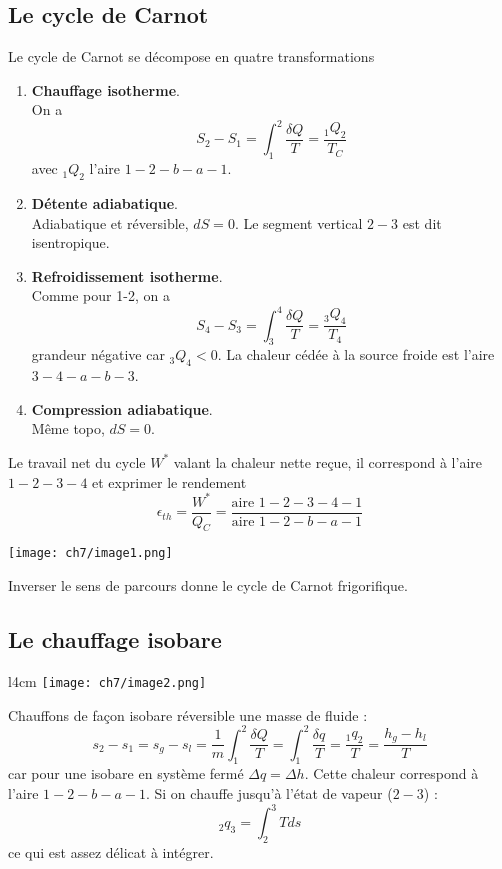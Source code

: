 		\subsection{Le cycle de Carnot}
		Le cycle de Carnot se décompose en quatre transformations
		\begin{enumerate}
		\item \textbf{Chauffage isotherme}.\\
		On a 
		\begin{equation}
		S_2-S_1 = \int_1^2 \dfrac{\delta Q}{T} = \dfrac{_1Q_2}{T_C}
		\end{equation}
		avec $_1Q_2$ l'aire $1-2-b-a-1$.
		\item \textbf{Détente adiabatique}.\\
		Adiabatique et réversible, $dS=0$. Le segment vertical $2-3$ est dit 
		isentropique.
		\item \textbf{Refroidissement isotherme}.\\
		Comme pour 1-2, on a
		\begin{equation}
		S_4-S_3 = \int_3^4 \dfrac{\delta Q}{T} = \dfrac{_3Q_4}{T_4}
		\end{equation}		
		grandeur négative car $_3Q_4<0$. La chaleur cédée à la source froide est 
		l'aire $3-4-a-b-3$.
		\item \textbf{Compression adiabatique}.\\
		Même topo, $dS=0$.
		\end{enumerate}
		Le travail net du cycle $W^*$ valant la chaleur nette reçue, il correspond 
		à l'aire $1-2-3-4$ et exprimer le rendement 
		\begin{equation}
		\epsilon_{th} = \dfrac{W^*}{Q_C} = \frac{\text{aire } 1-2-3-4-1}{\text{aire } 
		1-2-b-a-1}
		\end{equation}
			\begin{center}
	\texttt{[image: ch7/image1.png]}
	\end{center}
		Inverser le sens de parcours donne le cycle de Carnot frigorifique.
		
		\subsection{Le chauffage isobare}
		\begin{wrapfigure}[10]{l}{4cm}
		\vspace{-5mm}
		\texttt{[image: ch7/image2.png]}
		\end{wrapfigure}
		Chauffons de façon isobare réversible une masse de fluide  :
		\begin{equation}
		s_2-s_1 = s_g-s_l = \dfrac{1}{m}\int_1^2 \dfrac{\delta Q}{T} = 
		\int_1^2 \frac{\delta q}{T} = \dfrac{_1q_2}{T} = \dfrac{h_g-h_l}{T}
		\end{equation}
		car pour une isobare en système fermé $\Delta q = \Delta h$. Cette chaleur 
		correspond à l'aire $1-2-b-a-1$. Si on chauffe jusqu'à l'état de vapeur ($2-3$) :
		\begin{equation}
		_2q_3 = \int_2^3 Tds
		\end{equation}
		ce qui est assez délicat à intégrer.
	
